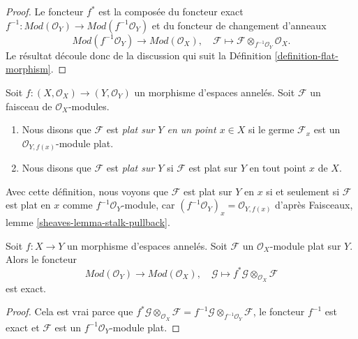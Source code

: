 \begin{proof}
Le foncteur $f^*$ est la composée du foncteur exact
$f^{-1} : \textit{Mod}(\mathcal{O}_Y) \to \textit{Mod}(f^{-1}\mathcal{O}_Y)$
et du foncteur de changement d'anneaux
$$
\textit{Mod}(f^{-1}\mathcal{O}_Y) \to \textit{Mod}(\mathcal{O}_X), \quad
\mathcal{F} \longmapsto
\mathcal{F} \otimes_{f^{-1}\mathcal{O}_Y} \mathcal{O}_X.
$$
Le résultat découle donc de la discussion qui suit la
Définition \ref{definition-flat-morphism}.
\end{proof}

\begin{definition}
\label{definition-flat-module}
Soit $f : (X, \mathcal{O}_X) \to (Y, \mathcal{O}_Y)$ un morphisme
d'espaces annelés. Soit $\mathcal{F}$ un faisceau de $\mathcal{O}_X$-modules.
\begin{enumerate}
\item Nous disons que $\mathcal{F}$ est {\it plat sur $Y$ en un point $x \in X$}
si le germe $\mathcal{F}_x$ est un $\mathcal{O}_{Y, f(x)}$-module plat.
\item Nous disons que $\mathcal{F}$ est {\it plat sur $Y$} si
$\mathcal{F}$ est plat sur $Y$ en tout point $x$ de $X$.
\end{enumerate}
\end{definition}

\noindent
Avec cette définition, nous voyons que $\mathcal{F}$ est plat sur $Y$ en $x$
si et seulement si $\mathcal{F}$ est plat en $x$ comme
$f^{-1}\mathcal{O}_Y$-module, car
$(f^{-1}\mathcal{O}_Y)_x = \mathcal{O}_{Y, f(x)}$ d'après
Faisceaux, lemme \ref{sheaves-lemma-stalk-pullback}.

\begin{lemma}
\label{lemma-pullback-tensor-flat-module}
Soit $f : X \to Y$ un morphisme d'espaces annelés. Soit $\mathcal{F}$
un $\mathcal{O}_X$-module plat sur $Y$. Alors le foncteur
$$
\textit{Mod}(\mathcal{O}_Y) \to \textit{Mod}(\mathcal{O}_X),\quad
\mathcal{G} \longmapsto f^*\mathcal{G} \otimes_{\mathcal{O}_X} \mathcal{F}
$$
est exact.
\end{lemma}

\begin{proof}
Cela est vrai parce que
$f^*\mathcal{G} \otimes_{\mathcal{O}_X} \mathcal{F} =
f^{-1}\mathcal{G} \otimes_{f^{-1}\mathcal{O}_Y} \mathcal{F}$,
le foncteur $f^{-1}$ est exact et $\mathcal{F}$ est un
$f^{-1}\mathcal{O}_Y$-module plat.
\end{proof}















